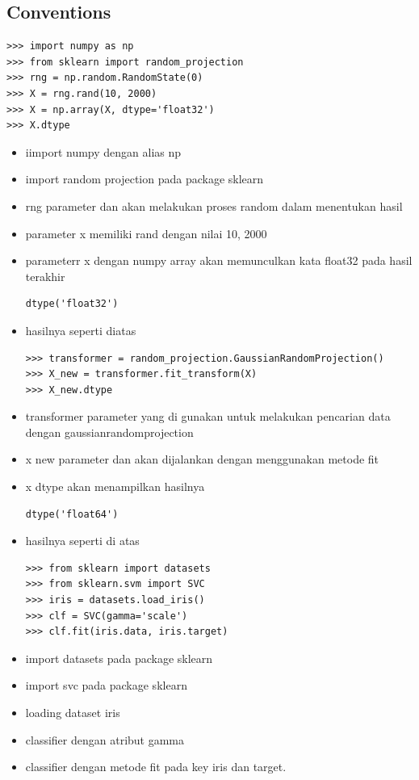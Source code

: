 \subsection{Conventions}
\begin{verbatim}
>>> import numpy as np
>>> from sklearn import random_projection
>>> rng = np.random.RandomState(0)
>>> X = rng.rand(10, 2000)
>>> X = np.array(X, dtype='float32')
>>> X.dtype
\end{verbatim}
\begin{itemize}
\item iimport numpy dengan alias np
\item import random projection pada package sklearn
\item rng parameter dan akan melakukan proses random dalam menentukan hasil
\item parameter x memiliki rand dengan nilai 10, 2000
\item parameterr x dengan numpy array akan memunculkan kata float32 pada hasil terakhir
\begin{verbatim}
dtype('float32')
\end{verbatim}
\item hasilnya seperti diatas
\begin{verbatim}
>>> transformer = random_projection.GaussianRandomProjection()
>>> X_new = transformer.fit_transform(X)
>>> X_new.dtype
\end{verbatim}
\item transformer parameter yang di gunakan untuk melakukan pencarian data dengan gaussianrandomprojection
\item x new parameter dan akan dijalankan dengan menggunakan metode fit
\item x dtype akan menampilkan hasilnya
\begin{verbatim}
dtype('float64')
\end{verbatim}
\item hasilnya seperti di atas
\begin{verbatim}
>>> from sklearn import datasets
>>> from sklearn.svm import SVC
>>> iris = datasets.load_iris()
>>> clf = SVC(gamma='scale')
>>> clf.fit(iris.data, iris.target)
\end{verbatim}
\item import datasets pada package sklearn
\item import svc pada package sklearn
\item loading dataset iris
\item classifier dengan atribut gamma
\item classifier dengan metode fit pada key iris dan target.

\end{itemize}
